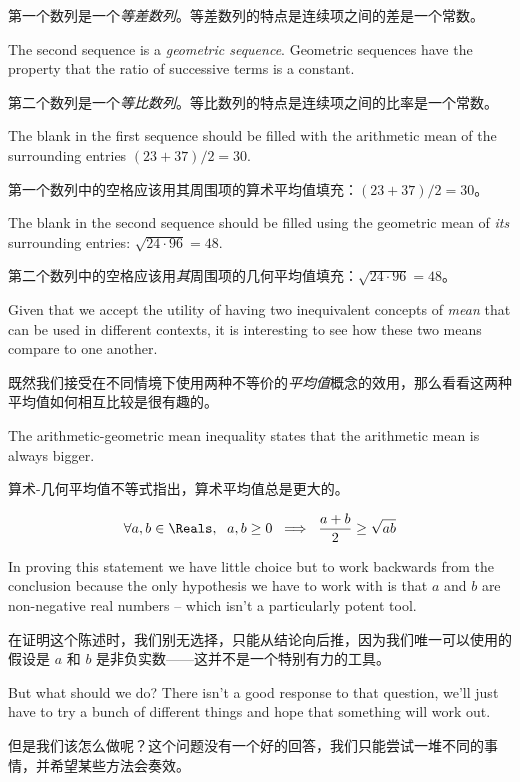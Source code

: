 第一个数列是一个\emph{等差数列}。等差数列的特点是连续项之间的差是一个常数。

The second sequence is a
\emph{geometric sequence}.
Geometric sequences have the property that the ratio of successive terms
is a constant.

第二个数列是一个\emph{等比数列}。等比数列的特点是连续项之间的比率是一个常数。

The blank in the first sequence should be filled with the
arithmetic mean of the surrounding entries $(23+37)/2 = 30$.

第一个数列中的空格应该用其周围项的算术平均值填充：$(23+37)/2 = 30$。

The blank
in the second sequence should be filled using the
geometric mean
of \emph{its} surrounding entries: $\sqrt{24\cdot 96} = 48$.

第二个数列中的空格应该用\emph{其}周围项的几何平均值填充：$\sqrt{24\cdot 96} = 48$。

Given that we accept the utility of having two inequivalent concepts
of \emph{mean} that can be used in different contexts, it is interesting
to see how these two means compare to one another.

既然我们接受在不同情境下使用两种不等价的\emph{平均值}概念的效用，那么看看这两种平均值如何相互比较是很有趣的。

The
arithmetic-geometric mean inequality states that the arithmetic mean
is always bigger.

算术-几何平均值不等式指出，算术平均值总是更大的。

\[ \forall a,b \in \Reals, \rule{6pt}{0pt}  a,b \geq 0 \; \implies \; \frac{a+b}{2} \geq \sqrt{ab} \]

In proving this statement we have little choice but to work backwards
from the conclusion because the only hypothesis we have to work with
is that $a$ and $b$ are non-negative real numbers -- which isn't a
particularly potent tool.

在证明这个陈述时，我们别无选择，只能从结论向后推，因为我们唯一可以使用的假设是 $a$ 和 $b$ 是非负实数——这并不是一个特别有力的工具。

But what should we do?
There isn't a good response to that
question, we'll just have to try a bunch of different things and hope
that something will work out.

但是我们该怎么做呢？这个问题没有一个好的回答，我们只能尝试一堆不同的事情，并希望某些方法会奏效。

